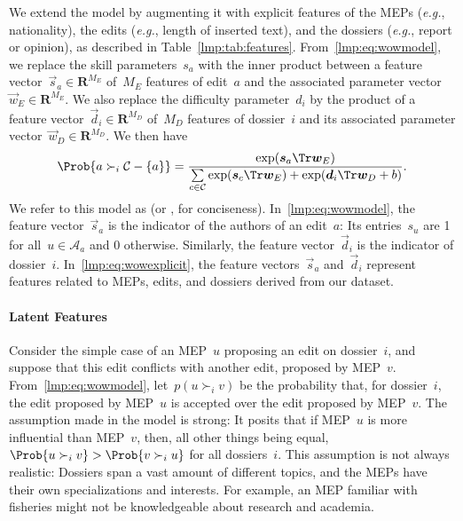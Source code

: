 We extend the \wow{} model by augmenting it with explicit features of the MEPs (\textit{e.g.}, nationality), the edits (\textit{e.g.}, length of inserted text), and the dossiers (\textit{e.g.}, report or opinion), as described in Table~\ref{lmp:tab:features}.
From~\eqref{lmp:eq:wowmodel}, we replace the skill parameters~$s_a$ with the inner product between a feature vector~$\vec{s}_a \in \mathbf{R}^{M_E}$ of~$M_E$ features of edit~$a$ and the associated parameter vector~$\vec{w}_E \in \mathbf{R}^{M_E}$.
We also replace the difficulty parameter~$d_i$ by the product of a feature vector~$\vec{d}_i \in \mathbf{R}^{M_D}$ of~$M_D$ features of dossier~$i$ and its associated parameter vector~$\vec{w}_D \in \mathbf{R}^{M_D}$.
We then have
\begin{equation}
	\label{lmp:eq:wowexplicit}
	\Prob{ a \succ_i \mathcal{C} - \{ a\} } =
	\frac{\exp(\vec{s}_a\Tr \vec{w}_E) }{ \sum\limits_{c \in \mathcal{C} } \exp(\vec{s}_c\Tr \vec{w}_E) + \exp(\vec{d}_i \Tr \vec{w}_D + b) }.
\end{equation}
We refer to this model as  (or , for conciseness).
In~\eqref{lmp:eq:wowmodel}, the feature vector~$\vec{s}_a$ is the indicator of the authors of an edit~$a$:
Its entries~$s_u$ are 1 for all~$u \in \mathcal{A}_a$ and 0 otherwise.
Similarly, the feature vector~$\vec{d}_i$ is the indicator of dossier~$i$.
In~\eqref{lmp:eq:wowexplicit}, the feature vectors~$\vec{s}_a$ and~$\vec{d}_i$ represent features related to MEPs, edits, and dossiers derived from our dataset.

\paragraph{Latent Features}

Consider the simple case of an MEP~$u$ proposing an edit on dossier~$i$, and suppose that this edit conflicts with another edit, proposed by MEP~$v$.
From~\eqref{lmp:eq:wowmodel}, let~$p( u \succ_i v)$ be the probability that, for dossier~$i$, the edit proposed by MEP~$u$ is accepted over the edit proposed by MEP~$v$.
The assumption made in the \wow{} model is strong:
It posits that if MEP~$u$ is more influential than MEP~$v$, then, all other things being equal,~$\Prob{u \succ_i v} > \Prob{v \succ_i u}$ for all dossiers~$i$.
This assumption is not always realistic:
Dossiers span a vast amount of different topics, and the MEPs have their own specializations and interests.
For example, an MEP familiar with fisheries might not be knowledgeable about research and academia.

